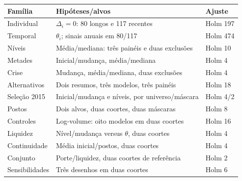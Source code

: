 \begin{tabular}{lp{}l}
\toprule
Família & Hipóteses/alvos & Ajuste\\\midrule
Individual & $\Delta_i=0$: 80 longos e 117 recentes & Holm 197\\
Temporal & $\theta_i$; sinais anuais em 80/117 & Holm 474\\
Níveis & Média/mediana: três painéis e duas exclusões & Holm 10\\
Metades & Inicial/mudança, média/mediana & Holm 4\\
Crise & Mudança, média/mediana, duas exclusões & Holm 4\\
Alternativos & Dois resumos, três modelos, três painéis & Holm 18\\
Seleção 2015 & Inicial/mudança e níveis, por universo/máscara & Holm 4/2\\
Postos & Dois alvos, duas coortes, duas máscaras & Holm 8\\
Controles & Log-volume: oito modelos em duas coortes & Holm 16\\
Liquidez & Nível/mudança versus $\theta$, duas coortes & Holm 4\\
Continuidade & Média inicial/postos, duas coortes & Holm 4\\
Conjunto & Porte/liquidez, duas coortes de referência & Holm 2\\
Sensibilidades & Três desenhos em duas coortes & Holm 6\\\bottomrule
\end{tabular}
